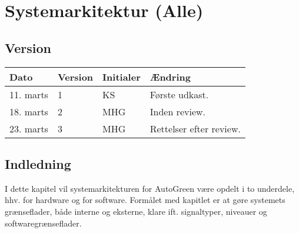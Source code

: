 \chapter{Systemarkitektur (Alle)}

\section{Version}
\begin{table}[h]
	\centering
	\begin{tabularx}{\textwidth - 2cm}{|l|l|l|X|}
	\hline
	Dato	& Version	& Initialer & Ændring	\\ \hline
	11. marts & 1 & KS & Første udkast. \\ \hline
	18. marts & 2 & MHG & Inden review. \\\hline
	23. marts & 3 & MHG & Rettelser efter review. \\\hline		 
	\end{tabularx}
\end{table}

\section{Indledning}

I dette kapitel vil systemarkitekturen for AutoGreen være opdelt i to underdele, hhv. for hardware og for software. Formålet med kapitlet er at gøre systemets grænseflader, både interne og eksterne, klare ift. signaltyper, niveauer og softwaregrænseflader.







